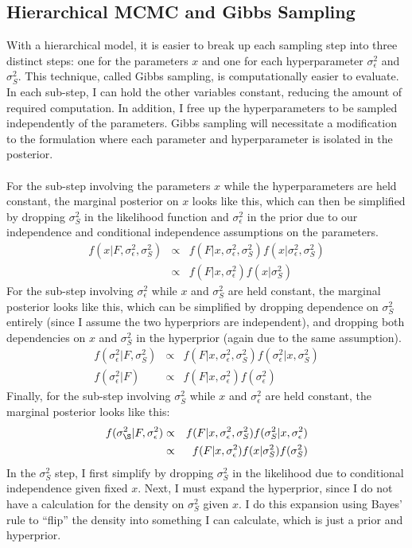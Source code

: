 \documentclass[12pt, letterpaper]{article}
\begin{document}
\subsection{Hierarchical MCMC and Gibbs Sampling}
With a hierarchical model, it is easier to break up each sampling step into three distinct steps: one for the parameters $x$
and one for each hyperparameter $\sigma^2_\epsilon$ and $\sigma^2_S$. This technique, called Gibbs sampling, is computationally easier
to evaluate. In each sub-step, I can hold the other variables constant, reducing the amount of required computation. In addition,
I free up the hyperparameters to be sampled independently of the parameters. Gibbs sampling will necessitate a modification to 
the formulation where each parameter and hyperparameter is isolated in the posterior.
\\\\
For the sub-step involving the parameters $x$ while the hyperparameters are held constant, the marginal posterior on $x$ looks like this,
which can then be simplified by dropping $\sigma^2_S$ in the likelihood function and $\sigma^2_\epsilon$ in the prior
due to our independence and conditional independence assumptions on the parameters.
\begin{eqnarray*}
    f(x | F, \sigma^2_\epsilon, \sigma^2_S) & \propto & f(F | x, \sigma^2_\epsilon, \sigma^2_S) f(x | \sigma^2_\epsilon, \sigma^2_S) \\
                                            & \propto & f(F | x, \sigma^2_\epsilon) f(x | \sigma^2_S)
\end{eqnarray*}
For the sub-step involving $\sigma^2_\epsilon$ while $x$ and $\sigma^2_S$ are held constant, the marginal posterior looks like this,
which can be simplified by dropping dependence on $\sigma^2_S$ entirely (since I assume the two hyperpriors are independent),
and dropping both dependencies on $x$ and $\sigma^2_S$ in the hyperprior (again due to the same assumption).
\begin{eqnarray*}
    f(\sigma^2_\epsilon | F, \sigma^2_S) & \propto & f(F | x, \sigma^2_\epsilon, \sigma^2_S) f(\sigma^2_\epsilon | x, \sigma^2_S) \\
    f(\sigma^2_\epsilon | F)             & \propto & f(F | x, \sigma^2_\epsilon) f(\sigma^2_\epsilon)
\end{eqnarray*}
Finally, for the sub-step involving $\sigma^2_S$ while $x$ and $\sigma^2_\epsilon$ are held constant, the marginal posterior
looks like this: 
\begin{eqnarray*}
    f(\sigma^2_\S | F, \sigma^2_\epsilon) & \propto & f(F | x, \sigma^2_\epsilon, \sigma^2_S) f(\sigma^2_S | x, \sigma^2_\epsilon) \\
                                          & \propto & f(F | x, \sigma^2_\epsilon) f(x | \sigma^2_S) f(\sigma^2_S)
\end{eqnarray*}
In the $\sigma^2_S$ step, I first simplify by dropping $\sigma^2_S$ in the likelihood due to conditional independence given fixed $x$.
Next, I must expand the hyperprior, since I do not have a calculation for the density on $\sigma^2_S$ given $x$.
I do this expansion using Bayes' rule to ``flip'' the density into something I can calculate, which is just a prior and hyperprior.
\end{document}
